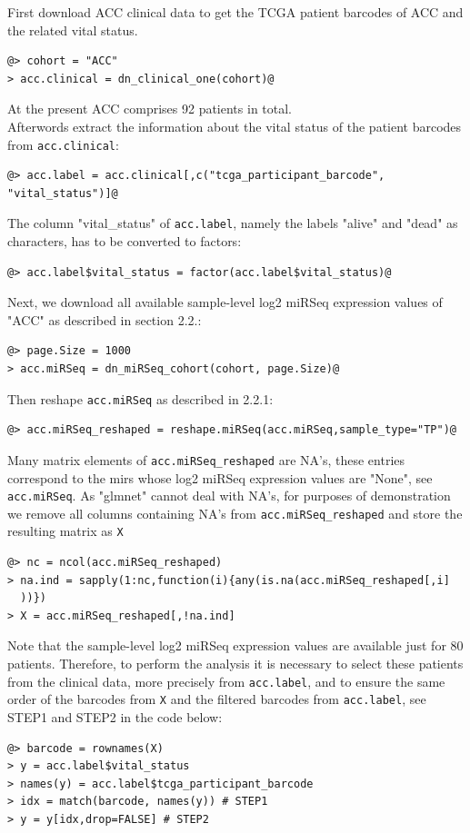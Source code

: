 \documentclass{TechReport}
\begin{document}
First download ACC clinical data to get the TCGA patient barcodes of ACC and the
related vital status.
\begin{lstlisting}[style=base]
@> cohort = "ACC"
> acc.clinical = dn_clinical_one(cohort)@
\end{lstlisting}
At the present ACC comprises 92 patients in total.\\ 
Afterwords extract the information about the vital status of the patient barcodes
from {\tt acc.clinical}:
\begin{lstlisting}[style=base]
@> acc.label = acc.clinical[,c("tcga_participant_barcode",
"vital_status")]@
\end{lstlisting}
The column "vital\_status" of {\tt acc.label}, namely the labels "alive" and "dead" as characters, 
has to be converted to factors:
\begin{lstlisting}[style=base]
@> acc.label$vital_status = factor(acc.label$vital_status)@
\end{lstlisting}
Next, we download all available sample-level log2 miRSeq expression values of "ACC"
as described in section 2.2.:
\begin{lstlisting}[style=base]
@> page.Size = 1000
> acc.miRSeq = dn_miRSeq_cohort(cohort, page.Size)@
\end{lstlisting}
Then reshape {\tt acc.miRSeq} as described in 2.2.1:
\begin{lstlisting}[style=base]
@> acc.miRSeq_reshaped = reshape.miRSeq(acc.miRSeq,sample_type="TP")@
\end{lstlisting}
Many matrix elements of {\tt acc.miRSeq\_reshaped} are NA's, these entries correspond
to the mirs whose log2 miRSeq expression values are "None", see {\tt acc.miRSeq}.
 As "glmnet" cannot deal with NA's, for purposes of demonstration we remove all columns containing NA's
from {\tt acc.miRSeq\_reshaped} and store the resulting matrix as {\tt X}
\begin{lstlisting}[style=base]
@> nc = ncol(acc.miRSeq_reshaped)
> na.ind = sapply(1:nc,function(i){any(is.na(acc.miRSeq_reshaped[,i]
  ))})
> X = acc.miRSeq_reshaped[,!na.ind]
\end{lstlisting}
Note that the sample-level log2 miRSeq expression values are available just for 80 patients.
Therefore, to perform the analysis it is necessary to select these patients from the clinical data, 
more precisely from {\tt acc.label}, and to ensure the same order of the barcodes from {\tt X}
and the filtered barcodes from {\tt acc.label}, see STEP1 and STEP2 in the code below:
\begin{lstlisting}[style=base]
@> barcode = rownames(X) 
> y = acc.label$vital_status
> names(y) = acc.label$tcga_participant_barcode
> idx = match(barcode, names(y)) # STEP1
> y = y[idx,drop=FALSE] # STEP2
\end{lstlisting}
\end{document}
